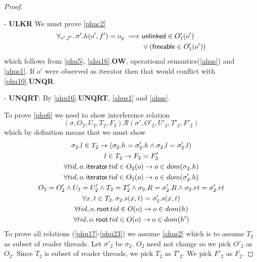 \begin{proof}
\begin{case}
\end{case}
\begin{case} - \textbf{ULKR} We must prove \ref{phuc2}
  \begin{gather}\label{phuc2}
    \begin{aligned}
      \forall_{o',f'} \ldotp \sigma'.h(o',f') = o_y \implies & \textsf{unlinked} \in O'_1(o')  \\
      &\lor (\textsf{freeable} \in O'_1(o'))
      \end{aligned}
\end{gather}
which follows from \ref{phu5}, \ref{ahu16}.\textbf{OW}, operational semantics(\ref{ahus}) and \ref{ahus1}. If $o'$ were observed as \textsf{iterator} then that would conflict with \ref{phu10}.\textbf{UNQR}. 
\end{case}
\begin{case} - \textbf{UNQRT}: By \ref{ahu16}.\textbf{UNQRT}, \ref{ahus1} and \ref{ahus}.
\end{case}
To prove \ref{phu6} we need to show interference relation
\[(\sigma, O_2, U_2, T_2,F_2) \mathcal{R} (\sigma', O'_2, U'_2, T'_2,F'_2)  \]
which by definition means that we must show 
\begin{gather}\label{phu17}
  \sigma_2.l  \in  T_2 \rightarrow (\sigma_2.h =\sigma'_2.h \land \sigma_2.l=\sigma'_2.l)\\
  \label{phu18}
  l\in T_2\rightarrow F_2=F_2'\\
  \label{phu20}
  \forall tid,o\ldotp\textsf{iterator} \, tid \in O_2(o) \rightarrow o \in dom(\sigma_2.h) \\
  \label{phu21}
  \forall tid,o\ldotp\textsf{iterator} \, tid \in O_2(o) \rightarrow o \in dom(\sigma'_2.h) \\
  \label{phu22}
  O_2 = O_2' \land U_2 = U_2' \land T_2 = T_2' \land \sigma_2.R = \sigma'_2.R \land \sigma_2.rt = \sigma'_2.rt \\
  \label{phu23}
  \forall x, t \in T_2 \ldotp \sigma_2.s(x,t) = \sigma'_2.s(x,t) \\
  \label{phurt1}
  \forall tid,o\ldotp\textsf{root} \, tid \in O(o) \rightarrow o \in dom(h) \\
  \label{phurt2}
  \forall tid,o\ldotp\textsf{root} \, tid \in O(o) \rightarrow o \in dom(h') 
\end{gather}
To prove all relations (\ref{phu17}-\ref{phu23}) we assume \ref{ahus2} which is to assume $T_2$ as subset of reader threads. Let $\sigma'_2$ be $\sigma_2$. $O_2$ need not change so we pick $O'_2$  as $O_2$. Since $T_2$ is subset of reader threads, we pick $T_2$ as  $T'_2$. We pick $F'_2$ as $F_2$.


\end{proof}
